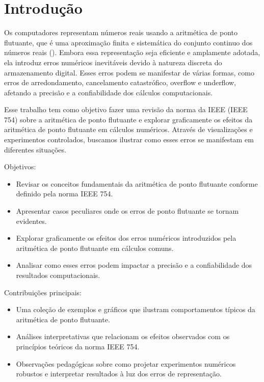 
\section{Introdução}
\label{sec:intro}

Os computadores representam números reais usando a aritmética de ponto flutuante, que é uma aproximação finita e sistemática do conjunto continuo dos números reais (\cite{IEEE754_2019}). Embora essa representação seja eficiente e amplamente adotada, ela introduz erros numéricos inevitáveis devido à natureza discreta do armazenamento digital. Esses erros podem se manifestar de várias formas, como erros de arredondamento, cancelamento catastrófico, overflow e underflow, afetando a precisão e a confiabilidade dos cálculos computacionais.

Esse trabalho tem como objetivo fazer uma revisão da norma da IEEE (IEEE 754) sobre a aritmética de ponto flutuante e explorar graficamente os efeitos da aritmética de ponto flutuante em cálculos numéricos. Através de visualizações e experimentos controlados, buscamos ilustrar como esses erros se manifestam em diferentes situações.


Objetivos:
\begin{itemize}
    \item Revisar os conceitos fundamentais da aritmética de ponto flutuante conforme definido pela norma IEEE 754.
    \item Apresentar casos peculiares onde os erros de ponto flutuante se tornam evidentes.
    \item Explorar graficamente os efeitos dos erros numéricos introduzidos pela aritmética de ponto flutuante em cálculos comuns.
    \item Analisar como esses erros podem impactar a precisão e a confiabilidade dos resultados computacionais.
\end{itemize}

Contribuições principais:
\begin{itemize}
    \item Uma coleção de exemplos e gráficos que ilustram comportamentos típicos da aritmética de ponto flutuante.
    \item Análises interpretativas que relacionam os efeitos observados com os princípios teóricos da norma IEEE 754.
    \item Observações pedagógicas sobre como projetar experimentos numéricos robustos e interpretar resultados à luz dos erros de representação.
\end{itemize}

